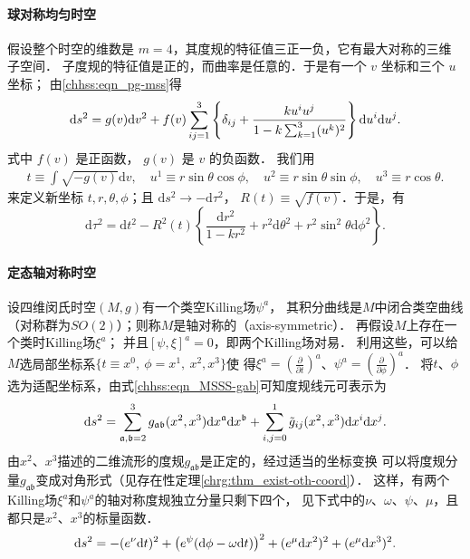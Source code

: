 
\paragraph{球对称均匀时空}
假设整个时空的维数是 $m=4$，其度规的特征值三正一负，它有最大对称的三维子空间．
子度规的特征值是正的，而曲率是任意的．于是有一个 $v$ 坐标和三个 $u$ 坐标；
由\eqref{chhss:eqn_pg-mss}得
\begin{equation}\label{chhss:eqn_g-cos}
    \mathrm{d} s^2=g(v) \mathrm{d} v^2  +f(v) \sum_{ij=1}^{3} \left\{\delta_{ij} 
    + \frac{k u^i u^j}{1-k \sum_{k=1}^{3}(u^k)^2}\right\} {\rm d} u^i {\rm d} u^j.
\end{equation}
式中 $f(v)$ 是正函数， $g(v)$ 是 $v$ 的负函数．
我们用
\begin{align*}
    t\equiv\int \sqrt{-g(v)}\mathrm{d} v,\quad
    u^1 \equiv r \sin \theta \cos \phi, \quad
    u^2 \equiv r \sin \theta \sin \phi, \quad
    u^3 \equiv r \cos \theta .
\end{align*}
来定义新坐标 $t, r, \theta, \phi$；且 $\mathrm{d} s^2 \to -\mathrm{d} \tau^2$，
$R(t) \equiv \sqrt{f(v)}$．于是，有
\begin{equation}\label{chhss:eqn_g-cos-2}
    \mathrm{d} \tau^2=\mathrm{d} t^2-R^2(t)\left\{\frac{\mathrm{d} r^2}{1-k r^2}
    +r^2 \mathrm{d} \theta^2+r^2 \sin ^2 \theta \mathrm{d} \phi^2\right\}    .
\end{equation}


\paragraph{定态轴对称时空}\label{chhss:sec_axis-sym}

设四维闵氏时空$(M,g)$有一个类空Killing场$\psi^a$，
其积分曲线是$M$中闭合类空曲线（对称群为$SO(2)$）；则称$M$是{\heiti 轴对称的}（axis-symmetric）．
再假设$M$上存在一个类时Killing场$\xi^a$；
并且$[\psi,\xi]^a=0$，即两个Killing场对易．
利用这些，可以给$M$选局部坐标系$\{t\equiv x^0,\ \phi=x^1, \  x^2, x^3\}$使
得$\xi^a=(\frac{\partial}{\partial t})^a$、$\psi^a=(\frac{\partial}{\partial \phi})^a$．
将$t$、$\phi$选为适配坐标系，由式\eqref{chhss:eqn_MSSS-gab}可知度规线元可表示为
\begin{equation*}
    \mathrm{d} s^2= \sum_{\mathfrak{a,b}=2}^{3}
    g_{\mathfrak{ab}}(x^2,x^3) \mathrm{d} x^{\mathfrak{a}} \mathrm{d} x^{\mathfrak{b}}
    +\sum_{i,j=0}^{1} \tilde{g}_{i j}(x^2,x^3) {\rm d}x^i  {\rm d}x^j.
\end{equation*}
由$x^2$、$x^3$描述的二维流形的度规$g_{\mathfrak{ab}}$是正定的，经过适当的坐标变换
可以将度规分量$g_{\mathfrak{ab}}$变成对角形式（见存在性定理\ref{chrg:thm_exist-oth-coord}）．
这样，有两个Killing场$\xi^a$和$\psi^a$的轴对称度规独立分量只剩下四个，
见下式中的$\nu$、$\omega$、$\psi$、$\mu$，且都只是$x^2$、$x^3$的标量函数．
\begin{equation}\label{chhss:eqn_AS-metric}
    \mathrm{d} s^2= - (e^{\nu}{\rm d}t)^2 
    + \bigl(e^{\psi} ({\rm d}\phi -\omega {\rm d}t )\bigr)^2
    + (e^{\mu}{\rm d}x^2)^2 +(e^{\mu}{\rm d}x^3)^2 .
\end{equation}


